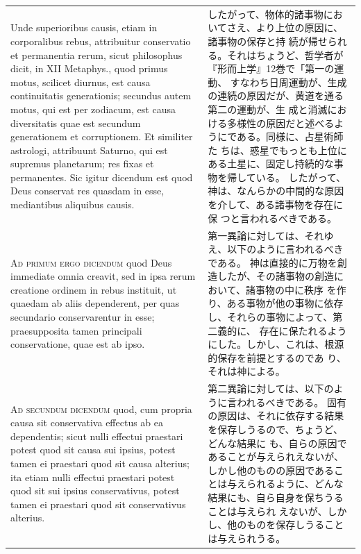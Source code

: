 \documentclass[paper=a4paper,fontsize=10pt,jafontsize=9pt,titlepage]{jlreq}
\begin{document}
\begin{longtable}{p{21em}p{21em}}
\\


Unde superioribus
causis, etiam in corporalibus rebus, attribuitur conservatio et
permanentia rerum, sicut philosophus dicit, in XII Metaphys., quod
primus motus, scilicet diurnus, est causa continuitatis generationis;
secundus autem motus, qui est per zodiacum, est causa diversitatis quae
est secundum generationem et corruptionem. Et similiter astrologi,
attribuunt Saturno, qui est supremus planetarum; res fixas et
permanentes. Sic igitur dicendum est quod Deus conservat res quasdam in
esse, mediantibus aliquibus causis.

&

したがって、物体的諸事物においてさえ、より上位の原因に、諸事物の保存と持
 続が帰せられる。それはちょうど、哲学者が『形而上学』12巻で「第一の運動、
 すなわち日周運動が、生成の連続の原因だが、黄道を通る第二の運動が、生
 成と消滅における多様性の原因だと述べるようにである。同様に、占星術師た
 ちは、惑星でもっとも上位にある土星に、固定し持続的な事物を帰している。
 したがって、神は、なんらかの中間的な原因を介して、ある諸事物を存在に保
 つと言われるべきである。


\\


{\scshape Ad primum ergo dicendum} quod Deus immediate
omnia creavit, sed in ipsa rerum creatione ordinem in rebus instituit,
ut quaedam ab aliis dependerent, per quas secundario conservarentur in
esse; praesupposita tamen principali conservatione, quae est ab ipso.

&

第一異論に対しては、それゆえ、以下のように言われるべきである。
神は直接的に万物を創造したが、その諸事物の創造において、諸事物の中に秩序
 を作り、ある事物が他の事物に依存し、それらの事物によって、第二義的に、
 存在に保たれるようにした。しかし、これは、根源的保存を前提とするのであ
 り、それは神による。

\\


{\scshape Ad secundum dicendum} quod, cum propria causa
sit conservativa effectus ab ea dependentis; sicut nulli effectui
praestari potest quod sit causa sui ipsius, potest tamen ei praestari
quod sit causa alterius; ita etiam nulli effectui praestari potest quod
sit sui ipsius conservativus, potest tamen ei praestari quod sit
conservativus alterius.

&


第二異論に対しては、以下のように言われるべきである。
固有の原因は、それに依存する結果を保存しうるので、ちょうど、どんな結果に
 も、自らの原因であることが与えられえないが、しかし他のものの原因であるこ
 とは与えられるように、どんな結果にも、自ら自身を保ちうることは与えられ
 えないが、しかし、他のものを保存しうることは与えられうる。


\end{longtable}
\end{document}
